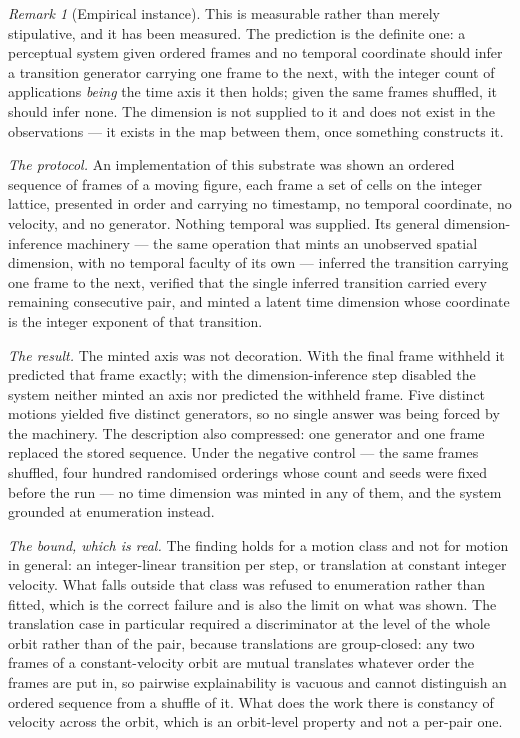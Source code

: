 \documentclass[11pt,a4paper]{article}
\theoremstyle{remark}\newtheorem{remark}[definition]{Remark}
\begin{document}
\begin{remark}[Empirical instance]\label{rem:empirical-instance}
This is measurable rather than merely stipulative, and it has been measured. The prediction is the definite one: a perceptual system given ordered frames and no temporal coordinate should infer a transition generator carrying one frame to the next, with the integer count of applications \emph{being} the time axis it then holds; given the same frames shuffled, it should infer none. The dimension is not supplied to it and does not exist in the observations --- it exists in the map between them, once something constructs it.

\emph{The protocol.} An implementation of this substrate was shown an ordered sequence of frames of a moving figure, each frame a set of cells on the integer lattice, presented in order and carrying no timestamp, no temporal coordinate, no velocity, and no generator. Nothing temporal was supplied. Its general dimension-inference machinery --- the same operation that mints an unobserved spatial dimension, with no temporal faculty of its own --- inferred the transition carrying one frame to the next, verified that the single inferred transition carried every remaining consecutive pair, and minted a latent time dimension whose coordinate is the integer exponent of that transition.

\emph{The result.} The minted axis was not decoration. With the final frame withheld it predicted that frame exactly; with the dimension-inference step disabled the system neither minted an axis nor predicted the withheld frame. Five distinct motions yielded five distinct generators, so no single answer was being forced by the machinery. The description also compressed: one generator and one frame replaced the stored sequence. Under the negative control --- the same frames shuffled, four hundred randomised orderings whose count and seeds were fixed before the run --- no time dimension was minted in any of them, and the system grounded at enumeration instead.

\emph{The bound, which is real.} The finding holds for a motion class and not for motion in general: an integer-linear transition per step, or translation at constant integer velocity. What falls outside that class was refused to enumeration rather than fitted, which is the correct failure and is also the limit on what was shown. The translation case in particular required a discriminator at the level of the whole orbit rather than of the pair, because translations are group-closed: any two frames of a constant-velocity orbit are mutual translates whatever order the frames are put in, so pairwise explainability is vacuous and cannot distinguish an ordered sequence from a shuffle of it. What does the work there is constancy of velocity across the orbit, which is an orbit-level property and not a per-pair one.


\end{remark}
\end{document}
